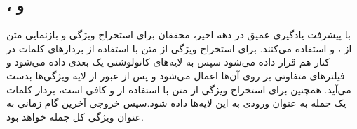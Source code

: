 \subsection{‌، ‌‌و }
	با پیشرفت یادگیری عمیق در دهه اخیر، محققان برای استخراج ویژگی و بازنمایی متن از
	،
	\cite{hochreiter1997long}
	و
	\cite{cho2014learning}
	استفاده می‌کنند. برای استخراج ویژگی از متن با استفاده از 
	بردارهای کلمات در کنار هم قرار داده می‌شود سپس به لایه‌های کانولوشنی یک بعدی داده می‌شود و فیلتر‌های متفاوتی بر روی آن‌ها اعمال می‌شود و پس از عبور از لایه‌ 
	ویژگی‌ها بدست می‌آید. همچنین برای استخراج ویژگی از متن با استفاده از 
	و
	کافی است، بردار کلمات یک جمله به عنوان ورودی به این لایه‌ها داده شود.سپس خروجی آخرین گام زمانی به عنوان ویژگی کل جمله خواهد بود. 
